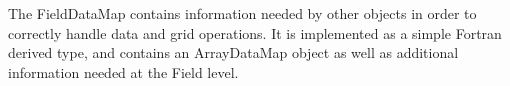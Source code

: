 
The FieldDataMap contains information needed by other objects
in order to correctly handle data and grid operations.
It is implemented as a simple Fortran derived type, and 
contains an ArrayDataMap object as well as additional 
information needed at the Field level.


